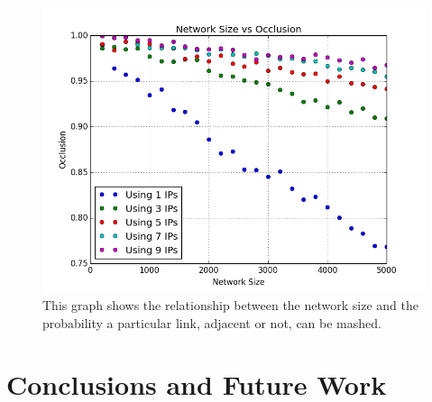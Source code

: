 \documentclass[a4paper]{article}
\begin{document}
\begin{figure}
    \centering
    \includegraphics[width=\linewidth]{size_occlusion_chord}
    \caption{This graph shows the relationship between the network size and the probability a particular link, adjacent or not, can be mashed.}
    \label{fig:exp3}
\end{figure}







\section{Conclusions and Future Work}
\label{sec:horror}
\end{document}
